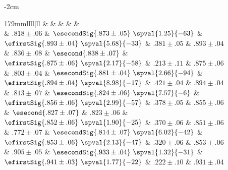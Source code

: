 \begin{table*}[htb]
\begin{adjustwidth}{-2cm}{}
  \centering
  \small
  \caption{Standardized AMI of 5 methods, when generating directions with 7 configurations. For each
    configuration, we generate directions 200 times, and report the mean standardized AMI along with
    the standard deviation. Among the first three methods (that do not use matrix formulation), we
    highlight the best one in \textbf{\textcolor{brown}{bold brown}} and the second best one in
    \textit{\textcolor{red}{italic red}}. When the difference between a score and the next best one
    is statistically significant (\ie{} when we can confidently reject the hypothesis that the two
    distributions have the same mean), we furthermore show in parenthesis the supporting
    $p$-value of a paired Student's $t$-test.
  \label{tab:edge_Wvaries_nami}}
  \begin{tabulary}{179mm}{llll|ll}
    \toprule
     &         \thead{\kmeans{}} &                                  \thead{\lloyd{}} &                              \thead{\combined{}} &  \thead{\fwa{}} &  \thead{\pqt{}} \\
    \midrule
    {} &            $.818 \pm .06$ &  $\esecondSig{.873 \pm .05}\,\,\spval{1.25}{-63}$ &  $\efirstSig{.893 \pm .04}\,\,\spval{5.68}{-33}$ &  $.381 \pm .05$ &  $.893 \pm .04$ \\
    {\smallk{}}  &            $.836 \pm .08$ &                          $\esecond{.838 \pm .07}$ &  $\efirstSig{.875 \pm .06}\,\,\spval{2.17}{-58}$ &  $.213 \pm .11$ &  $.875 \pm .06$ \\
    {\largek{}}  &            $.803 \pm .04$ &  $\esecondSig{.881 \pm .04}\,\,\spval{2.66}{-94}$ &  $\efirstSig{.894 \pm .04}\,\,\spval{8.98}{-17}$ &  $.421 \pm .04$ &  $.894 \pm .04$ \\
    {\smallo{}}  &            $.813 \pm .07$ &   $\esecondSig{.824 \pm .06}\,\,\spval{7.57}{-6}$ &  $\efirstSig{.856 \pm .06}\,\,\spval{2.99}{-57}$ &  $.378 \pm .05$ &  $.855 \pm .06$ \\
    {\largeo{}}  &  $\esecond{.827 \pm .07}$ &                                    $.823 \pm .06$ &  $\efirstSig{.852 \pm .06}\,\,\spval{1.90}{-25}$ &  $.370 \pm .06$ &  $.851 \pm .06$ \\
    {\fdirs{}}   &            $.772 \pm .07$ &  $\esecondSig{.814 \pm .07}\,\,\spval{6.02}{-42}$ &  $\efirstSig{.853 \pm .06}\,\,\spval{2.13}{-47}$ &  $.320 \pm .06$ &  $.853 \pm .06$ \\
    {\larged{}}  &            $.905 \pm .05$ &  $\esecondSig{.933 \pm .04}\,\,\spval{1.32}{-31}$ &  $\efirstSig{.941 \pm .03}\,\,\spval{1.77}{-22}$ &  $.222 \pm .10$ &  $.931 \pm .04$ \\
    \bottomrule
  \end{tabulary}
\end{adjustwidth}
\end{table*}

